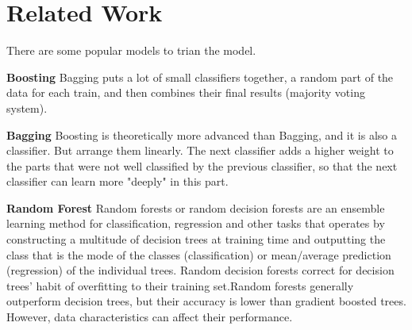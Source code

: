 %
%
%
%
%
%
%
%
%
%
%
%

\section{Related Work} \label{sec-Related Work}
There are some popular models to trian the model.
\par
\textbf{Boosting} \quad Bagging puts a lot of small classifiers together, a random part of the data for each train, and then combines their final results (majority voting system).
\par
\textbf{Bagging} \quad Boosting is theoretically more advanced than Bagging, and it is also a classifier. But arrange them linearly. The next classifier adds a higher weight to the parts that were not well classified by the previous classifier, so that the next classifier can learn more "deeply" in this part.
\par
\textbf{Random Forest} \quad Random forests or random decision forests are an ensemble learning method for classification, regression and other tasks that operates by constructing a multitude of decision trees at training time and outputting the class that is the mode of the classes (classification) or mean/average prediction (regression) of the individual trees. Random decision forests correct for decision trees' habit of overfitting to their training set.Random forests generally outperform decision trees, but their accuracy is lower than gradient boosted trees. However, data characteristics can affect their performance.

